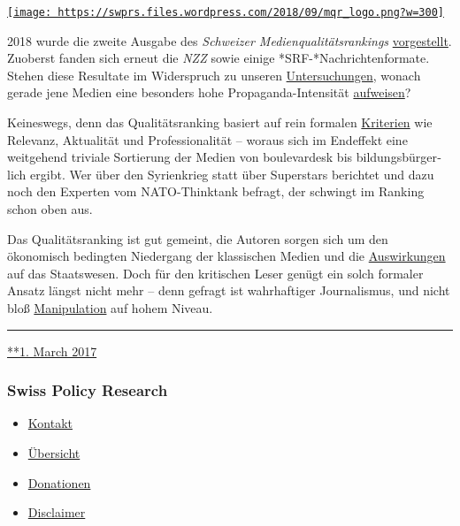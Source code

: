 \href{https://swprs.org/2017/03/01/medienqualitaet/}{\texttt{[image: https://swprs.files.wordpress.com/2018/09/mqr\_logo.png?w=300]}}

2018 wurde die zweite Ausgabe des \emph{Schweizer
Medien­qualitäts­rankings}
\href{http://medienqualitaet-schweiz.ch/files/3115/3578/3114/MQR-18_Hauptbefunde.pdf}{vorgestellt}.
Zuoberst fanden sich erneut die \emph{NZZ} sowie einige
*SRF-*Nach­rich­ten­for­mate. Stehen diese Resultate im Widerspruch zu
unseren \href{https://swprs.org/die-nzz-studie/}{Untersuchungen}, wonach
gerade jene Medien eine besonders hohe Propaganda-Intensität
\href{https://swprs.org/srf-propaganda-analyse/}{aufweisen}?

Keineswegs, denn das Qualitätsranking basiert auf rein formalen
\href{http://www.medienqualitaet-schweiz.ch/index.php/qualitaetsrating/}{Kriterien}
wie Relevanz, Aktualität und Professionalität -- woraus sich im
Endeffekt eine weitgehend triviale Sortierung der Medien von
boulevardesk bis bildungs­bürger­lich ergibt. Wer über den Syrienkrieg
statt über Superstars berichtet und dazu noch den Experten vom
NATO-Thinktank befragt, der schwingt im Ranking schon oben aus.

Das Qualitätsranking ist gut gemeint, die Autoren sorgen sich um den
ökonomisch bedingten Niedergang der klassischen Medien und die
\href{https://www.nzz.ch/feuilleton/medien/was-die-medien-fuer-die-schweizer-demokratie-leisten-ld.1416854}{Auswirkungen}
auf das Staatswesen. Doch für den kritischen Leser genügt ein solch
formaler Ansatz längst nicht mehr -- denn gefragt ist wahrhaftiger
Journalismus, und nicht bloß
\href{https://swprs.org/der-propaganda-schluessel/}{Manipulation} auf
hohem Niveau.

\begin{center}\rule{0.5\linewidth}{\linethickness}\end{center}

\href{https://swprs.org/2017/03/01/medienqualitaet/}{**1. March 2017}

\hypertarget{swiss-policy-research}{%
\subsubsection{Swiss Policy Research}\label{swiss-policy-research}}

\begin{itemize}
\tightlist
\item
  \href{https://swprs.org/kontakt/}{Kontakt}
\item
  \href{https://swprs.org/uebersicht/}{Übersicht}
\item
  \href{https://swprs.org/donationen/}{Donationen}
\item
  \href{https://swprs.org/disclaimer/}{Disclaimer}
\end{itemize}

